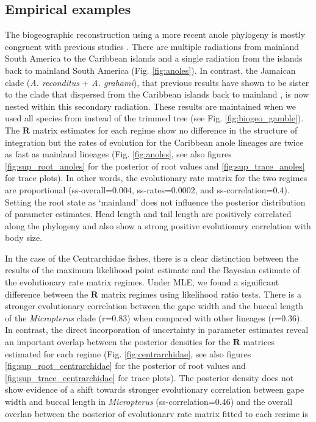 \subsection{Empirical examples}

The biogeographic reconstruction using a more recent anole phylogeny \citep{gamble_anolis_2014} is mostly congruent with previous studies \citep{glor_out_2005, nicholson_mainland_2005, losos_lizards_2009}. There are multiple radiations from mainland South America to the Caribbean islands and a single radiation from the islands back to mainland South America (Fig. \ref{fig:anoles}). In contrast, the Jamaican clade (\textit{A. reconditus} + \textit{A. grahami}), that previous results have shown to be sister to the clade that dispersed from the Caribbean islands back to mainland \citep{losos_lizards_2009}, is now nested within this secondary radiation. These results are maintained when we used all species from \citet{gamble_anolis_2014} instead of the trimmed tree (see Fig. \ref{fig:biogeo_gamble}). The $\mathbf{R}$ matrix estimates for each regime show no difference in the structure of integration but the rates of evolution for the Caribbean anole lineages are twice as fast as mainland lineages (Fig. \ref{fig:anoles}, see also figures \ref{fig:sup_root_anoles} for the posterior of root values and \ref{fig:sup_trace_anoles} for trace plots). In other words, the evolutionary rate matrix for the two regimes are proportional (ss-overall=0.004, ss-rates=0.0002, and ss-correlation=0.4). Setting the root state as `mainland' does not influence the posterior distribution of parameter estimates.  Head length and tail length are positively correlated along the phylogeny and also show a strong positive evolutionary correlation with body size.

In the case of the Centrarchidae fishes, there is a clear distinction between the results of the maximum likelihood point estimate and the Bayesian estimate of the evolutionary rate matrix regimes. Under MLE, we found a significant difference between the $\mathbf{R}$ matrix regimes using likelihood ratio tests. There is a stronger evolutionary correlation between the gape width and the buccal length of the \textit{Micropterus} clade (r=0.83) when compared with other lineages (r=0.36). In contrast, the direct incorporation of uncertainty in parameter estimates reveal an important overlap between the posterior densities for the $\mathbf{R}$ matrices estimated for each regime (Fig. \ref{fig:centrarchidae}, see also figures \ref{fig:sup_root_centrarchidae} for the posterior of root values and \ref{fig:sup_trace_centrarchidae} for trace plots). The posterior density does not show evidence of a shift towards stronger evolutionary correlation between gape width and buccal length in \textit{Micropterus} (ss-correlation=0.46) and the overall overlap between the posterior of evolutionary rate matrix fitted to each regime is pronounced (ss-overall=0.58). Thus, after taking the uncertainty in parameter estimates into account, it is unlikely that a shift on the pattern of evolutionary correlation happened in the \textit{Micropterus} clade.

